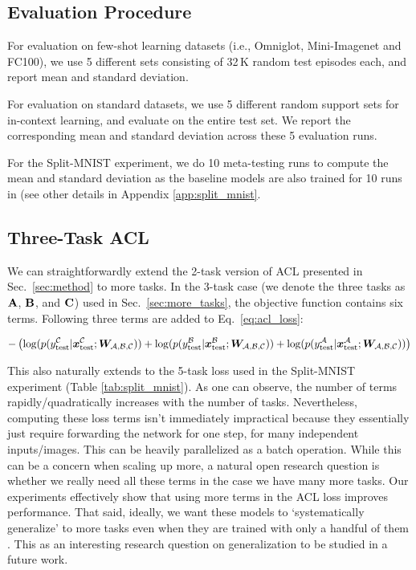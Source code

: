 \documentclass{article}
\begin{document}
\subsection{Evaluation Procedure}
\label{app:eval}
For evaluation on few-shot learning datasets (i.e., Omniglot, Mini-Imagenet and FC100),
we use 5 different sets consisting of 32\,K random test episodes each, and report mean and standard deviation.

For evaluation on standard datasets,
we use 5 different random support sets for in-context learning, and evaluate on the entire test set. We report the corresponding mean and standard deviation across these 5 evaluation runs.

For the Split-MNIST experiment, we do 10 meta-testing runs to compute the mean and standard deviation as the baseline models are also trained for 10 runs in \citet{hsu2018re} (see other details in Appendix \ref{app:split_mnist}.

\subsection{Three-Task ACL}
\label{app:3_task}
We can straightforwardly extend the 2-task version of ACL presented in Sec.~\ref{sec:method} to more tasks.
In the 3-task case (we denote the three tasks as ${\mathbf{A}}$, ${\mathbf{B}}$, and ${\mathbf{C}}$) used in Sec.~\ref{sec:more_tasks}, the objective function contains six terms.
Following three terms are added to Eq.~\ref{eq:acl_loss}:

\begin{align}
-\left(\log(p(y^{\mathcal{C}}_\text{test}|{\bm{x}}^{\mathcal{C}}_\text{test}; {\bm{W}}_{\mathcal{A, B, C}})) + \log(p(y^{\mathcal{B}}_\text{test}|{\bm{x}}^{\mathcal{B}}_\text{test}; {\bm{W}}_{\mathcal{A, B, C}})) + \log(p(y^{\mathcal{A}}_\text{test}|{\bm{x}}^{\mathcal{A}}_\text{test}; {\bm{W}}_{\mathcal{A, B, C}})) \right)
\end{align}

This also naturally extends to the 5-task loss used in the Split-MNIST experiment (Table \ref{tab:split_mnist}).
As one can observe, the number of terms rapidly/quadratically increases with the number of tasks.
Nevertheless, computing these loss terms isn't immediately impractical because they essentially just require forwarding the network for one step, for many independent inputs/images. This can be heavily parallelized as a batch operation.
While this can be a concern when scaling up more, a natural open research question is whether we really need all these terms in the case we have many more tasks. Our experiments effectively show that using more terms in the ACL loss improves performance. That said, ideally, we want these models to `systematically generalize' to more tasks even when they are trained with only a handful of them \citep{fodor1988connectionism}. This as an interesting research question on generalization to be studied in a future work.
\end{document}
